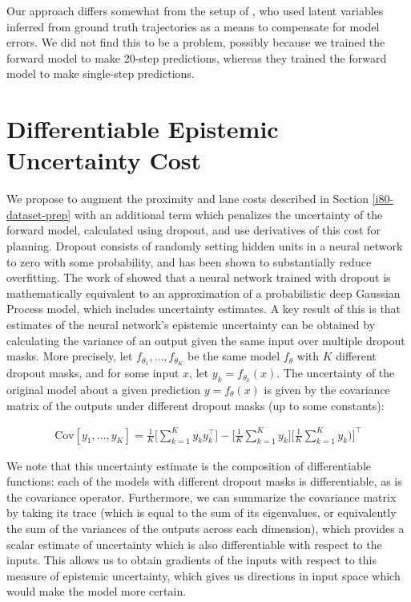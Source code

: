\documentclass{article} %
\begin{document}
    Our approach differs somewhat from the setup of \citep{SVG}, who used latent variables inferred from ground truth trajectories as a means to compensate for model errors. We did not find this to be a problem, possibly because we trained the forward model to make 20-step predictions, whereas they trained the forward model to make single-step predictions.






    \section{Differentiable Epistemic Uncertainty Cost}

    We propose to augment the proximity and lane costs described in Section \ref{i80-dataset-prep} with an additional term which penalizes the uncertainty of the forward model, calculated using dropout, and use derivatives of this cost for planning.
    Dropout \citep{Dropout2012, Dropout2014} consists of randomly setting hidden units in a neural network to zero with some probability, and has been shown to substantially reduce overfitting.
    The work of \citep{Gal16} showed that a neural network trained with dropout is mathematically equivalent to an approximation of a probabilistic deep Gaussian Process model, which includes uncertainty estimates.
    A key result of this is that estimates of the neural network's epistemic uncertainty can be obtained by calculating the variance of an output given the same input over multiple dropout masks.
    More precisely, let $f_{\theta_1}, ..., f_{\theta_K}$ be the same model $f_\theta$ with $K$ different dropout masks, and for some input $x$, let $y_k=f_{\theta_k}(x)$.
    The uncertainty of the original model about a given prediction $y=f_\theta(x)$ is given by the covariance matrix of the outputs under different dropout masks (up to some constants):

    \begin{align}
      \mbox{Cov}[y_1, ..., y_K] = \frac{1}{K} \Big[ \sum_{k=1}^K y_k y_k^\top \Big] - \Big[ \frac{1}{K}\sum_{k=1}^K y_k \Big] \Big[\frac{1}{K}\sum_{k=1}^K y_k)\Big]^\top
    \end{align}

    We note that this uncertainty estimate is the composition of differentiable functions: each of the models with different dropout masks is differentiable, as is the covariance operator.
    Furthermore, we can summarize the covariance matrix by taking its trace (which is equal to the sum of its eigenvalues, or equivalently the sum of the variances of the outputs across each dimension), which provides a scalar estimate of uncertainty which is also differentiable with respect to the inputs.
    This allows us to obtain gradients of the inputs with respect to this measure of epistemic uncertainty, which gives us directions in input space which would make the model more certain.
\end{document}
